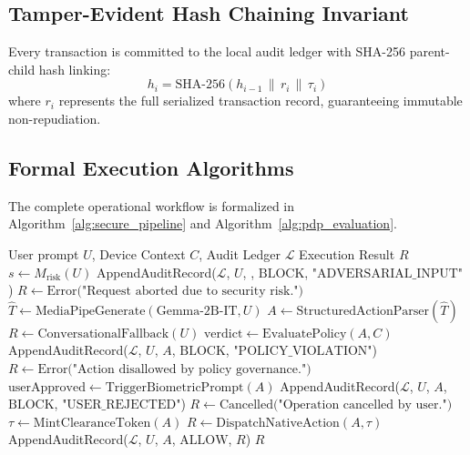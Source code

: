\subsection{Tamper-Evident Hash Chaining Invariant}
Every transaction is committed to the local audit ledger with SHA-256 parent-child hash linking:
\begin{equation}
h_i = \text{SHA-256}(h_{i-1} \,\|\, r_i \,\|\, \tau_i)
\end{equation}
where $r_i$ represents the full serialized transaction record, guaranteeing immutable non-repudiation.

\subsection{Formal Execution Algorithms}
The complete operational workflow is formalized in Algorithm~\ref{alg:secure_pipeline} and Algorithm~\ref{alg:pdp_evaluation}.

\begin{algorithm}[htbp]
\caption{End-to-End Secure Agent Execution Pipeline}
\label{alg:secure_pipeline}
\begin{algorithmic}[1]
\REQUIRE User prompt $U$, Device Context $C$, Audit Ledger $\mathcal{L}$
\ENSURE Execution Result $R$
\STATE $s \leftarrow M_{\text{risk}}(U)$ 
    \STATE AppendAuditRecord($\mathcal{L}$, $U$, , $\text{BLOCK}$, $\text{"ADVERSARIAL\_INPUT"}$)
    \RETURN $R \leftarrow \text{Error("Request aborted due to security risk.")}$
\ENDIF
\STATE $\hat{T} \leftarrow \text{MediaPipeGenerate}(\text{Gemma-2B-IT}, U)$ 
\STATE $A \leftarrow \text{StructuredActionParser}(\hat{T})$ 
    \RETURN $R \leftarrow \text{ConversationalFallback}(U)$
\ENDIF
\STATE $\text{verdict} \leftarrow \text{EvaluatePolicy}(A, C)$ 
    \STATE AppendAuditRecord($\mathcal{L}$, $U$, $A$, $\text{BLOCK}$, $\text{"POLICY\_VIOLATION"}$)
    \RETURN $R \leftarrow \text{Error("Action disallowed by policy governance.")}$
    \STATE $\text{userApproved} \leftarrow \text{TriggerBiometricPrompt}(A)$
        \STATE AppendAuditRecord($\mathcal{L}$, $U$, $A$, $\text{BLOCK}$, $\text{"USER\_REJECTED"}$)
        \RETURN $R \leftarrow \text{Cancelled("Operation cancelled by user.")}$
    \ENDIF
\ENDIF
\STATE $\tau \leftarrow \text{MintClearanceToken}(A)$ 
\STATE $R \leftarrow \text{DispatchNativeAction}(A, \tau)$ 
\STATE AppendAuditRecord($\mathcal{L}$, $U$, $A$, $\text{ALLOW}$, $R$) 
\RETURN $R$
\end{algorithmic}
\end{algorithm}

